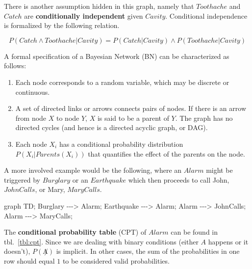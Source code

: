 \documentclass[
]{book}
\newenvironment{Shaded}{}{}
\newcommand{\NormalTok}[1]{#1}
\providecommand{\tightlist}{%
  \setlength{\itemsep}{0pt}\setlength{\parskip}{0pt}}
\begin{document}
There is another assumption hidden in this graph, namely that
\(Toothache\) and \(Catch\) are \textbf{conditionally independent} given
\(Cavity\). Conditional independence is formalized by the following
relation.

\[
P(Catch \land Toothache | Cavity) = P(Catch | Cavity) \land P(Toothache |
Cavity)
\]

A formal specification of a Bayesian Network (BN) can be characterized
as follows:

\begin{enumerate}
\def\labelenumi{\arabic{enumi}.}
\tightlist
\item
  Each node corresponds to a random variable, which may be discrete or
  continuous.
\item
  A set of directed links or arrows connects pairs of nodes. If there is
  an arrow from node \(X\) to node \(Y\), \(X\) is said to be a parent
  of \(Y\). The graph has no directed cycles (and hence is a directed
  acyclic graph, or DAG).
\item
  Each node \(X_i\) has a conditional probability distribution
  \(P(X_i | Parents(X_i))\) that quantifies the effect of the parents on
  the node.
\end{enumerate}

A more involved example would be the following, where an \(Alarm\) might
be triggered by \(Burglary\) or an \(Earthquake\) which then proceeds to
call John, \(JohnCalls\), or Mary, \(MaryCalls\).

\hypertarget{fig:alarm}{%
\label{fig:alarm}}%
\begin{Shaded}
\begin{Highlighting}[]
\NormalTok{graph TD;}
\NormalTok{    Burglary {-}{-}{-}\textgreater{} Alarm;}
\NormalTok{    Earthquake {-}{-}{-}\textgreater{} Alarm;}
\NormalTok{    Alarm {-}{-}{-}\textgreater{} JohnCalls;}
\NormalTok{    Alarm {-}{-}{-}\textgreater{} MaryCalls;}
\end{Highlighting}
\end{Shaded}

The \textbf{conditional probability table} (CPT) of \(Alarm\) can be
found in tbl.~\ref{tbl:cpt}. Since we are dealing with binary conditions
(either \(A\) happens or it doesn't), \(P(\not A)\) is implicit. In
other cases, the sum of the probabilities in one row should equal \(1\)
to be considered valid probabilities.
\end{document}
